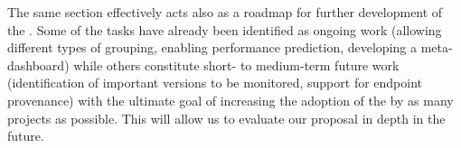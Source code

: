 \documentclass[conference]{IEEEtran}
\begin{document}
The same section effectively acts also as a roadmap for further development of the \tool. Some of the tasks have already been identified as ongoing work (allowing different types of grouping, enabling performance prediction, developing a meta-dashboard) while others constitute short- to medium-term future work (identification of important versions to be monitored, support for endpoint provenance) with the ultimate goal of increasing the adoption of the \tool by as many projects as possible. This will allow us to evaluate our proposal in depth in the future.


%
%



% 







\end{document}
